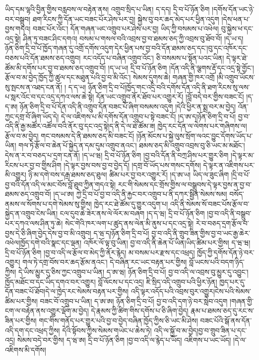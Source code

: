 ཡིད་དམ་ལྷའི་བྱིན་གྱིས་བརླབས་ལ་བརྟེན་ནས། འགྲུབ་སྲིད་པ་ཡིན། ད་དད། དྲི་བ་པོ་ཉོན་ཅིག །དགོས་དོན་ཡང་ཉེ་བར་བསྒྲུབ། ཐག་རིངས་ཀྱི་དོན་ཡང་བཟང་པོར་ཤེས་པར་བྱ། སྐྱེས་བུ་བར་ཆད་མེད་པར་ཕྱིན་འདུག །དེས་ཕན་པ་བྱས་གདའ། བཟང་པོར་འོང་། དོན་གཞན་ཡང་འགྲུབ་པར་ཤེས་པར་བྱ། ཡིད་ཀྱི་བསམས་པ་འཕེལ། བུ་སྐྱེས་ཕ་དང་འདྲ་སྟེ། ཤིན་ཏུ་བཟང་ཤིང་དགའ། བསམ་པ་གསལ་བའི་འབྲས་བྱ་བ་ཐམས་ཅད་ཀྱི་འབྲས་བུ་ཐོབ་བོ། །ད་ཡ་ད། ཉོན་ཅིག་དྲི་བ་པོ་ཁྱོད་གཞན་དུ་འགྲོ་དགོས་འདུག་དེར་ཕྱིན་པས་བྱ་བའི་དོན་ཐམས་ཅད་དང་།བུ་དང་འཁོར་དང་བཅས་པའི་དོན་ཐམས་ཅད་འགྲུབ། རང་འདོད་པ་བཞིན་འགྲུབ་འོང་། ཅི་བསམས་པ་སྟོན་པའང་ཡིན། དེ་ལྟར་ཐེ་ཚོམ་མི་དགོས་པར་བྱ་བ་ཐམས་ཅད་འགྲུབ་བོ། །ད་ཡ་ཡ། དྲི་བ་པོ་ཉོན་ཅིག །དོན་འདི་ནི་ལྕགས་རྡོ་དང་འདྲ་སྟེ་གྱོང་། རྩོལ་བ་མ་བྱེད་ཁྱོད་ཀྱི་ཚུལ་དང་མཐུན་པའི་བྱ་བ་མི་འོང་། སེམས་དུགས་ཆེ། གཞན་གྱི་ཁར་འགྲོ །མི་འགྲུབ་ཡོངས་སུ་སྤངས་ན་འཐད་ངན་ནོ། །
ད་ད་ཡ། ཉོན་ཅིག་དྲི་བ་པོ།ཁྱོད་གང་འདྲི་བའི་དགོས་དོན་འདི་ནི་ཐག་རིངས་སུ་ལས་པ་སླར་འོང་བ་དང་འདྲ་དཀའ་ལས་ཆེ་སྟེ། དོན་ཡང་འགྲུབ་ནོར་ཐོབ་པར་འགྱུར་རོ། །བློ་བདེ་བར་གྱིས་བཟང་ངོ། །ད་ད་ཨ། ཉོན་ཅིག་དྲི་བ་པོ་དོན་འདི་ནི་འགྲུབ་དོན་བཟང་པོ་ཞིག་བསམས་འདུག །དེའི་ཕྱིར་ན་སྨྲ་བར་མ་བྱེད། འོན་ཀྱང་དགྲ་བོ་ཞིག་ཡོད་དེ། དེ་ལ་འཇིགས་པ་མི་དགོས་དོན་འགྲུབ་པ་སྟེ་བཟང་ངོ། །ད་ཨ་ད།ཉོན་ཅིག་དྲི་བ་པོ། བྱ་བ་འདི་ནི་རྒྱ་མཚོར་འཚོལ་བའི་ནོར་བུ་དང་འདྲ་སྟེ།ད་ནི་དེ་ལ་ཐེ་ཚོམ་ཟ། ཁྱེད་རང་དོན་ལ་ལེགས་པར་གཞིགས་ལ། རྩོལ་བ་མ་བྱེད། གང་བསམས་དེ་ནི་ཐམས་ཅད་མི་བཟང་ངོ། །ཉོན་མོངས་པ་སྐྱེ་ལུས་སྲོག་ལའང་བྱུང་དོགས་ཡོད་པ་ཡིན། གལ་ཏེ་རྩོལ་བ་ཆེན་པོ་སྐྱེད་ན་དམ་དུམ་འགྲུབ་ནའང་། ཐམས་ཅད་མི་འགྲུབ་འབྲས་བུ་ཅི་ཡང་མ་མཐོང་། དེས་ན་ར་བ་བཅད་པ་དྲག་ངན་ནོ། །ད་ཡ་ཝ། དྲི་བ་པོ་ཉོན་ཅིག །བྱ་བའི་དོན་ནི་བཀྲ་ཤིས་པར་གྱུར་ཅིག །དེ་ལྟར་མ་རིངས་པར་བྱ་བ་གྱིས་ཤིག །དེ་ལྟར་བྱས་བས་བྱ་བ་བྱེད་དོ། །དགྲ་བོ་ཡོད་པས་གསང་དགོས། དེ་ལྟར་ན་འཇིགས་པར་མི་འགྱུར། ཉི་མ་དགེ་བས་དརྒྲ་ཐམས་ཅད་ཐུལ། ཚིམ་པར་བྱ་བར་འགྱུར་རོ། །ད་ཨ་ཡ། ཡིད་ལ་ཟུང་ཞིག །དྲི་བ་པོ་བྱ་བའི་དོན་འདི་ལ་མང་བོས་བློ་ཐུབ་ཀྱིན་གདའ་སྟེ། རང་གི་སེམས་དང་གྲོས་གྱིས་ལ་བསྒྲུབས་དེ་ལྟར་བྱས་ན་བྱ་བ་ཐམས་ཅད་འགྲུབ་བོ། །ད་ཡ་ཨ། ཀྱེ་དྲི་བ་པོ་བྱ་བ་འདི་ནི་རྐྱང་བར་འགྲུབ་པ་ནི་དཀར་སྦྱིན་སེམས་སམ། བསོད་ནམས་ལ་སོགས་པ་དགེ་སེམས་སུ་གྱིས། ཁྱེད་རང་ཐེ་ཚོམ་དུ་གྱུར་འདུག་པ། འདི་ནི་སེམས་སོ་བཟང་པོས་རྩོལ་བ་སྐྱེད་ན་འགྲུབ་ངེས་ཡིན། ངལ་དུབ་ཆེ་ཟེར་ནས་ལེ་ལོར་མ་བཞག །ད་ད་ཝ། དྲི་བ་པོ་ཉོན་ཅིག །བྱ་བ་འདི་ནི་བསྒྲུབ་པར་དཀའ་ལས་ཤིན་ཏུ་ཆེ། སེང་གེའི་ཁར་ལག་པ་ཚུད་ནས་ལེན་མི་ནུས་པ་དང་འདྲ་སྟེ། རེ་བ་བཅད་དྲག་རྩོལ་བ་བྱས་དེ་ཅི་ཞིག་བྱེད་དེས་བྱ་བ་མི་འགྲུབ། ད་ཝ་ད།ཉོན་ཅིག་དྲི་བ་པོ། བྱ་བ་འདི་ནི་གྲུབ་ཟིན་གྱིས་བྱ་བ་ཡང་རྒྱ་ཆེར་འཕེལ།ཁྱོད་དགེ་བའི་སྣང་དང་ལྡན། འཁོར་ལོ་ལྟ་བུ་ཡིན། བྱ་བ་འདི་ནི་ཆེན་པོ་ཡིན།ཡིད་ཚིམ་པར་གྱིས། ད་ཝ་ཝ། དྲི་བ་པོ་ཉོན་ཅིག །བྱ་བ་འདི་ལ་རྩོལ་བ་མེད་ཀྱི་ནོར་རྙེད། མ་བསམ་པར་རྫས་དང་འཕྲད། ཁྱོད་ཀྱི་དགོས་དོན་ཉེ་བར་འགྱུར། གལ་ཏེ་དགྲ་བོས་བར་ཆད་རྩོམ་ནའང་། དེ་བཞིན་རང་ཡང་བརྟན་པར་གྱིས། བློ་ཡངས་པའི་བདག་ཉིད་ཀྱིས། དེ་ཡིས་མྱུར་དུ་ཅིས་ཀྱང་འགྲུབ་པ་ཡིན། ད་ཨ་ཝ། ཉོན་ཅིག་དྲི་བ་པོ། བྱ་བ་འདི་ལ་འབྲས་བུ་མྱུར་དུ་འབྱུང་། ཁྱོད་མཐོང་བ་དང་ཡིད་དགའ་བར་འགྱུར། བློ་ལོངས་པ་དང་འདྲ། ཇི་སྲིད་འདི་འགྲུབ་པའི་ཕྱིར་ཉོན། ཁྱད་པར་དུ་དོན་བཟང་པོ་ཐོབ།དེ་ལ་ཁྱེད་རང་སེམས་བརྟན་པར་གྱིས། འདི་ལྟར་འདོད་པའི་འབྲས་བུར་འགྱུར།ངེས་པའི་སེམས་ཚིམ་པར་གྱིས། བཟང་བོ་འགྲུབ་པ་ཡིན། ད་ཨ་ཨ། ཉོན་ཅིག་དྲི་བ་པོ། བྱ་བ་འདི་དག་ཉེ་བར་སླེབ་འདུག །གཞན་གྱི་ངག་ལ་བརྟེན་ནས་འགྱུར་ལྡོག་མ་བྱེད། དེ་རྣམས་ཀྱི་ཚིག་གིས་དགོས་པ་ཅི་ཞིག་བྱེད། རྣམ་པ་ཐམས་ཅད་དུ་རང་ས་ཟིན་པར་གྱིས། གང་གིས་གནོད་པར་གྱུར་པའི་བྱ་བ་བྱེད་བཞིན་ཁྱོད་ཀྱིས་ཅི་ཡང་མི་ཤེས། བཟང་པོའི་སྒོ་ནས་དོན་འདི་དག་དང་འཕྲད་ཀྱིས། དེའི་སྟོབས་ཀྱིས་སེམས་གཡེང་པ་ཆེས་ཏེ། འདི་ལ་སྐྱོ་བ་མ་བྱེད།བྱ་བ་གྲུབ་ཟིན་པ་དང་འདྲ། སེམས་བདེ་བར་གྱིས། ད་ཝ་ཨ། དྲི་བ་པོ་ཉོན་ཅིག །བྱ་བ་འདི་ལ་རྙེད་པ་ཡོད། འཇིགས་པ་ཡང་ཡོད། །དེ་ལ་འཇིགས་མི་དགོས། 